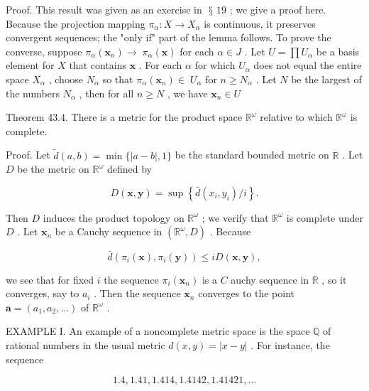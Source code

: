 \documentclass[10pt]{article}
\begin{document}
Proof. This result was given as an exercise in \(\text{ § }{19}\) ; we give a proof here. Because the projection mapping \({\pi }_{\alpha } : X \rightarrow  {X}_{\alpha }\) is continuous, it preserves convergent sequences; the "only if" part of the lemma follows. To prove the converse, suppose \({\pi }_{\alpha }\left( {\mathbf{x}}_{n}\right)  \rightarrow \; {\pi }_{\alpha }\left( \mathbf{x}\right)\) for each \(\alpha  \in  J\) . Let \(U = \prod {U}_{\alpha }\) be a basis element for \(X\) that contains \(\mathbf{x}\) . For each \(\alpha\) for which \({U}_{\alpha }\) does not equal the entire space \({X}_{\alpha }\) , choose \({N}_{\alpha }\) so that \({\pi }_{\alpha }\left( {\mathbf{x}}_{n}\right)  \in \; {U}_{\alpha }\) for \(n \geq  {N}_{\alpha }\) . Let \(N\) be the largest of the numbers \({N}_{\alpha }\) , then for all \(n \geq  N\) , we have \({\mathbf{x}}_{n} \in  U\)

Theorem 43.4. There is a metric for the product space \({\mathbb{R}}^{\omega }\) relative to which \({\mathbb{R}}^{\omega }\) is complete.

Proof. Let \(\widetilde{d}\left( {a,b}\right)  = \min \{ \left| {a - b}\right| ,1\}\) be the standard bounded metric on \(\mathbb{R}\) . Let \(D\) be the metric on \({\mathbb{R}}^{\omega }\) defined by

\[
D\left( {\mathbf{x},\mathbf{y}}\right)  = \sup \left\{  {\bar{d}\left( {{x}_{i},{y}_{i}}\right) /i}\right\}  .
\]

Then \(D\) induces the product topology on \({\mathbb{R}}^{\omega }\) ; we verify that \({\mathbb{R}}^{\omega }\) is complete under \(D\) . Let \({\mathbf{x}}_{n}\) be a Cauchy sequence in \(\left( {{\mathbb{R}}^{\omega },D}\right)\) . Because

\[
\bar{d}\left( {{\pi }_{i}\left( \mathbf{x}\right) ,{\pi }_{i}\left( \mathbf{y}\right) }\right)  \leq  {iD}\left( {\mathbf{x},\mathbf{y}}\right) ,
\]

we see that for fixed \(i\) the sequence \({\pi }_{i}\left( {\mathbf{x}}_{n}\right)\) is a \(C\) auchy sequence in \(\mathbb{R}\) , so it converges, say to \({a}_{i}\) . Then the sequence \({\mathbf{x}}_{n}\) converges to the point \(\mathbf{a} = \left( {{a}_{1},{a}_{2},\ldots }\right)\) of \({\mathbb{R}}^{\omega }\) .

EXAMPLE I. An example of a noncomplete metric space is the space \(\mathbb{Q}\) of rational numbers in the usual metric \(d\left( {x,y}\right)  = \left| {x - y}\right|\) . For instance, the sequence

\[
{1.4},{1.41},{1.414},{1.4142},{1.41421},\ldots
\]
\end{document}
